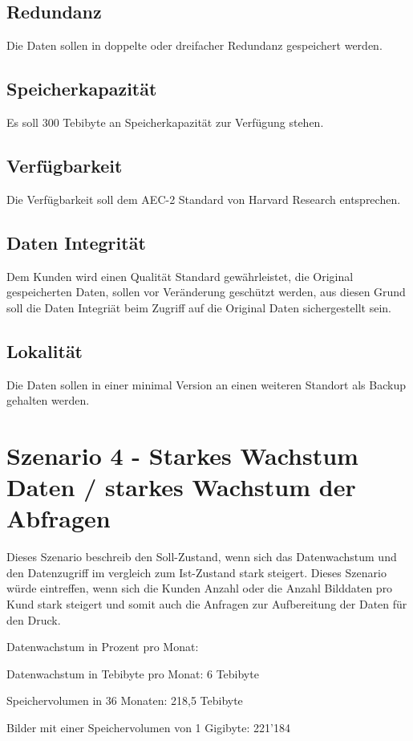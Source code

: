 \subsection{Redundanz}
Die Daten sollen in doppelte oder dreifacher Redundanz gespeichert werden.

\subsection{Speicherkapazität}
Es soll 300 Tebibyte an Speicherkapazität zur Verfügung stehen.

\subsection{Verfügbarkeit}
Die Verfügbarkeit soll dem AEC-2 Standard von Harvard Research entsprechen.

\subsection{Daten Integrität}
Dem Kunden wird einen Qualität Standard gewährleistet, die Original gespeicherten Daten, sollen vor Veränderung geschützt werden, aus diesen Grund soll die Daten Integriät beim Zugriff auf die Original Daten sichergestellt sein.

\subsection{Lokalität}
Die Daten sollen in einer minimal Version an einen weiteren Standort als Backup gehalten werden.

\section{Szenario 4 - Starkes Wachstum Daten / starkes Wachstum der Abfragen}
Dieses Szenario beschreib den Soll-Zustand, wenn sich das Datenwachstum und den Datenzugriff im vergleich zum Ist-Zustand stark steigert. Dieses Szenario würde eintreffen, wenn sich die Kunden Anzahl oder die Anzahl Bilddaten pro Kund stark steigert und somit auch die Anfragen zur Aufbereitung der Daten für den Druck.

Datenwachstum in Prozent pro Monat: 

Datenwachstum in Tebibyte pro Monat: 6 Tebibyte

Speichervolumen in 36 Monaten: 218,5 Tebibyte

Bilder mit einer Speichervolumen von 1 Gigibyte: 221'184

